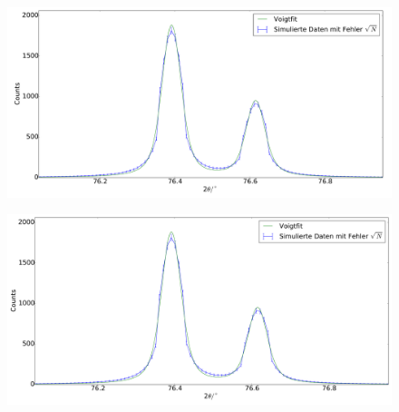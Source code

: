 \begin{figure}[H]
\begin{minipage}{.52\textwidth}
  \centering
  \includegraphics[scale=0.18]{Simulation_Siliciumpulver_5}
  \label{fig:pul_sim_sil_5}
\end{minipage}
\hspace{0.2cm}
\begin{minipage}{.52\textwidth}
  \centering
  \includegraphics[scale=0.18]{Simulation_Siliciumpulver_6}
  \label{fig:pul_sim_sil_6}
\end{minipage}
\end{figure}
